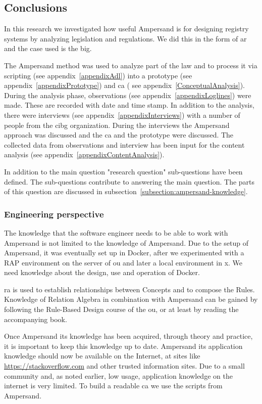 \subsection{Conclusions}\label{conclusions}

In this research we investigated how useful Ampersand is for designing registry systems by analyzing legislation and regulations.
We did this in the form of \acrshort{ar} and the case used is the \acrshort{big}.

The Ampersand method was used to analyze part of the law and to process it via scripting (see appendix~\ref{appendixAdl}) into a prototype (see appendix~\ref{appendixPrototype}) and \acrlong{ca} ( see appendix~\ref{ConceptualAnalysis}).
During the analysis phase, observations (see appendix~\ref{appendixLoglines}) were made.
These are recorded with date and time stamp.
In addition to the analysis, there were interviews (see appendix~\ref{appendixInterviews}) with a number of people from the \acrshort{cibg} organization.
During the interviews the Ampersand approach was discussed and the \acrlong{ca} and the prototype were discussed.
The collected data from observations and interview has been input for the content analysis (see appendix~\ref{appendixContentAnalysis}).

In addition to the main question "\acrlong{research question}" sub-questions have been defined. 
The sub-questions contribute to answering the main question.
The parts of this question are discussed in subsection~\ref{subsection:ampersand-knowledge}.

\subsubsection{Engineering perspective}\label{subsub:engineering_perspective}
The knowledge that the software engineer needs to be able to work with Ampersand is not limited to the knowledge of Ampersand.
Due to the setup of Ampersand, it was eventually set up in Docker, after we experimented with a RAP environment on the server of \acrlong{ou} and later a local environment in \acrshort{x}.
We need knowledge about the design, use and operation of Docker.

\acrlong{ra} is used to establish relationships between Concepts and to compose the Rules.
Knowledge of Relation Algebra in combination with Ampersand can be gained by following the Rule-Based Design course of the \acrshort{ou}, or at least by reading the accompanying book.

Once Ampersand its knowledge has been acquired, through theory and practice, it is important to keep this knowledge up to date.
Ampersand its application knowledge should now be available on the Internet, at sites like \url{https://stackoverflow.com} and other trusted information sites.
Due to a small community and, as noted earlier, low usage, application knowledge on the internet is very limited.
To build a readable \acrlong{ca} we use the scripts from Ampersand.

